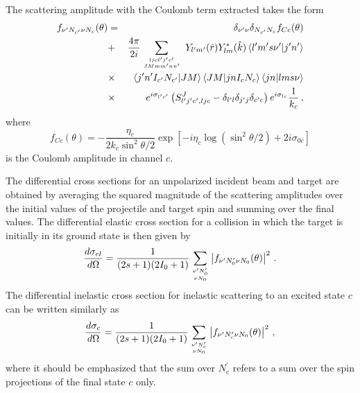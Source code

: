 \documentclass[twocolumn,amsmath,amssymb,10pt,groupedaddress,letter]{revtex4}
\begin{document}
The scattering amplitude with the Coulomb term extracted takes
the form \begin{eqnarray}
f_{\nu^{\prime}N_{c^{\prime}}\nu N_{c}}(\theta) & = & \delta_{\nu^{\prime}\nu}\delta_{N_{c^{\prime}}N_{c}}f_{Cc}(\theta) \\
 & + & \frac{4\pi}{2i}\sum_{{{ljcl^{\prime}j^{\prime}c^{\prime}\atop
      JMmm^{\prime}nn^{\prime}}}}\;
Y_{l^{\prime}m^{\prime}}(\hat{r})Y_{lm}^{*}(\hat{k})\left\langle
l^{\prime}m^{\prime}s\nu^{\prime}|j^{\prime}n^{\prime}\right\rangle \nonumber\\
& \times &\left\langle
j^{\prime}n^{\prime}I_{c^{\prime}}N_{c^{\prime}}|JM\right\rangle
\left\langle JM|jnI_{c}N_{c}\right\rangle \left\langle
jn|lms\nu\right\rangle \nonumber \\
&\times & e^{i\sigma_{l^{\prime}c^{\prime}}}\left(S_{l^{\prime}j^{\prime}c^{\prime},ljc}^{J}-\delta_{l^{\prime}l}\delta_{j^{\prime}j}\delta_{c^{\prime}c}\right)e^{i\sigma_{lc}}\frac{1}{k_{c}}\,,\nonumber \end{eqnarray}
 where \begin{equation}
f_{Cc}(\theta)=-\frac{\eta_{c}}{2k_{c}\sin^{2}\theta/2}\exp\left[-i\eta_{c}\log\left(\sin^{2}\theta/2\right)+2i\sigma_{0c}\right]\end{equation}
 is the Coulomb amplitude in channel $c$.

The differential cross sections for an unpolarized incident beam and
target are obtained by averaging the squared magnitude of the scattering
amplitudes over the initial values of the projectile and target spin
and summing over the final values. The differential elastic cross
section for a collision in which the target is initially in its ground
state is then given by \begin{equation}
\frac{d\sigma_{el}}{d\Omega}=\frac{1}{(2s+1)(2I_{0}+1)}\sum_{{{\nu^{\prime}N_{0}^{\prime}\atop \nu N_{0}}}}\left|f_{\nu^{\prime}N_{0}^{\prime}\nu N_{0}}(\theta)\right|^{2}\,.\label{celf}\end{equation}
 The differential inelastic cross section for inelastic scattering
to an excited state $c$ can be written similarly as \begin{equation}
\frac{d\sigma_{c}}{d\Omega}=\frac{1}{(2s+1)(2I_{0}+1)}\sum_{{{\nu^{\prime}N_{c}^{\prime}\atop \nu N_{0}}}}\left|f_{\nu^{\prime}N_{c}^{\prime}\nu N_{0}}(\theta)\right|^{2}\,,\end{equation}
 where it should be emphasized that the sum over $N_{c}^{\prime}$
refers to a sum over the spin projections of the final state $c$
only.
\end{document}
